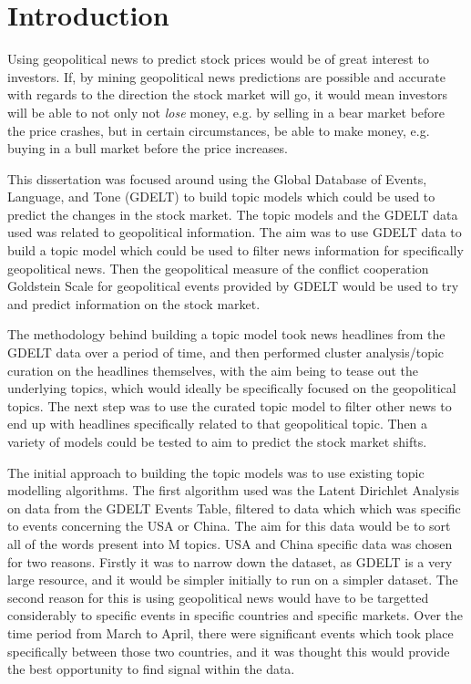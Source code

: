 \section{Introduction}
Using geopolitical news to predict stock prices would be of great interest to investors. If, by mining geopolitical news predictions are possible and accurate with regards to the direction the stock market will go, it would mean investors will be able to not only not \textit{lose} money, e.g. by selling in a bear market before the price crashes, but in certain circumstances, be able to make money, e.g. buying in a bull market before the price increases.

This dissertation was focused around using the Global Database of Events, Language, and Tone (GDELT) to build topic models which could be used to predict the changes in the stock market. The topic models and the GDELT data used was related to geopolitical information. The aim was to use GDELT data to build a topic model which could be used to filter news information for specifically geopolitical news. Then the geopolitical measure of the conflict cooperation Goldstein Scale for geopolitical events provided by GDELT would be used to try and predict information on the stock market.

The methodology behind building a topic model took news headlines from the GDELT data over a period of time, and then performed cluster analysis/topic curation on the headlines themselves, with the aim being to tease out the underlying topics, which would ideally be specifically focused on the geopolitical topics. The next step was to use the curated topic model to filter other news to end up with headlines specifically related to that geopolitical topic. Then a variety of models could be tested to aim to predict the stock market shifts.

The initial approach to building the topic models was to use existing topic modelling algorithms. The first algorithm used was the Latent Dirichlet Analysis on data from the GDELT Events Table, filtered to data which which was specific to events concerning the USA or China. The aim for this data would be to sort all of the words present into M topics. USA and China specific data was chosen for two reasons. Firstly it was to narrow down the dataset, as GDELT is a very large resource, and it would be simpler initially to run on a simpler dataset. The second reason for this is using geopolitical news would have to be targetted considerably to specific events in specific countries and specific markets. Over the time period from March to April, there were significant events which took place specifically between those two countries, and it was thought this would provide the best opportunity to find signal within the data. 

